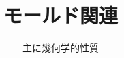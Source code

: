 


\usepackage{refcheck}


\setlength\baselineskip{18pt}
\setlength\normalbaselineskip{\baselineskip}


\titlehead{\hfill\small\customdate}
\subject{--- 計算メモ ---}
\title{\relax
  モールド関連\\[6pt]
  \baselineskip
}
\subtitle{主に幾何学的性質}
\author{}
\date{}
\publishers{}

\maketitle





\frontmatter



\tableofcontents



\mainmatter





